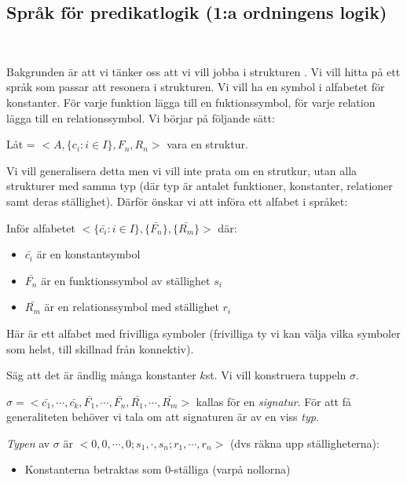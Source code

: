 \subsection{Språk för predikatlogik (1:a ordningens logik)}\hfill\\
\par\bigskip
\noindent Bakgrunden är att vi tänker oss att vi vill jobba i strukturen . Vi vill hitta på ett språk som passar att resonera i strukturen. Vi vill ha en symbol i alfabetet för konstanter. För varje funktion lägga till en fuktionssymbol, för varje relation lägga till en relationssymbol. Vi börjar på följande sätt:
\par\bigskip
\noindent Låt  = $<A, \{c_i:i\in I\}, F_n, R_n>$ vara en struktur.
\par\bigskip
\noindent Vi vill generalisera detta men vi vill inte prata om en strutkur, utan alla strukturer med samma typ (där typ är antalet funktioner, konstanter, relationer samt deras ställighet). Därför önskar vi att införa ett alfabet i språket:\par
\noindent Inför alfabetet $<\{\bar{c_i}:i\in I\}, \{\bar{F_n}\}, \{\bar{R_m}\}>$ där:
\begin{itemize}
  \item $\bar{c_i}$ är en konstantsymbol
  \item $\bar{F_n}$ är en funktionssymbol av ställighet $s_i$
  \item $\bar{R_m}$ är en relationssymbol med ställighet $r_i$ 
\end{itemize}
\par\bigskip
\noindent Här är ett alfabet med frivilliga symboler (frivilliga ty vi kan välja vilka symboler som helst, till skillnad från konnektiv).
\par\bigskip
\noindent Säg att det är ändlig många konstanter $k$st. Vi vill konstruera tuppeln $\sigma$.\par
\noindent $\sigma = <\bar{c_1},\cdots,\bar{c_k}, \bar{F_1},\cdots, \bar{F_n}, \bar{R_1},\cdots,\bar{R_m}>$ kallas för en \textit{signatur}. För att få generaliteten behöver vi tala om att signaturen är av en viss \textit{typ}.\par
\noindent \textit{Typen} av $\sigma$ är $<0,0,\cdots,0; s_1,\cdot, s_n; r_1,\cdots, r_n>$ (dvs räkna upp ställigheterna):
\begin{itemize}
  \item Konstanterna betraktas som 0-ställiga (varpå nollorna)
\end{itemize}
\par\bigskip
